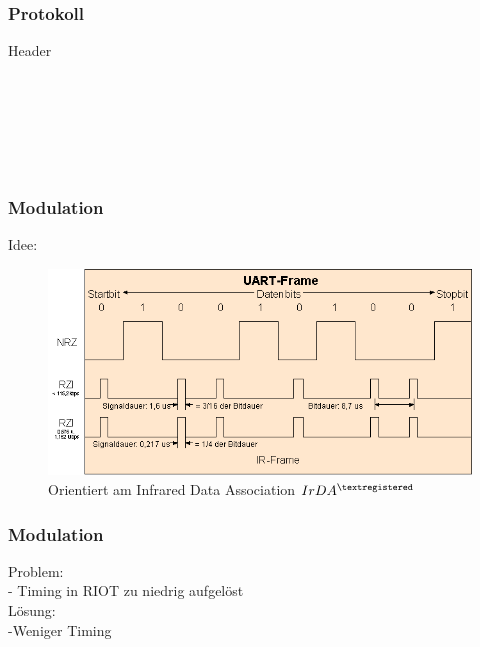 \documentclass{beamer}
\begin{document}
\begin{frame} %
  \frametitle{ Protokoll } %
  \begin{block}{Header}
  	\vspace{0.5cm}
  	\begin{center}
  	\begin{bytefield}{24}
			\\
			\\
			
			\\
			\\
			\skippedwords\\
		\end{bytefield}
		\end{center}
		\vspace{0.3cm}
  \end{block}
\end{frame}


\begin{frame} %
  \frametitle{ Modulation } %
  {\LARGE Idee:}
  \break
  \begin{figure}
  	\begin{center}
  		\includegraphics[scale=0.5]{Medien/Modulation.PNG}\\
  		Orientiert am Infrared Data Association $IrDA^{\textregistered}$
  	\end{center}
  \end{figure}
\end{frame}

\begin{frame} %
\frametitle{ Modulation } %
{\LARGE Problem:}\\
- Timing in RIOT zu niedrig aufgelöst\\
\break
{\LARGE Lösung:}\\
-Weniger Timing\\


\end{frame}
\end{document}
